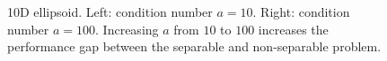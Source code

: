 \begin{figure}[h!]
\begin{minipage}[b]{0.5\linewidth}
 \centering
\end{minipage}
\begin{minipage}[b]{0.5\linewidth}
 \centering
\end{minipage}
\caption{10D ellipsoid. Left: condition number $a\!=\!10$.  Right: condition number $a\!=\!100$. Increasing $a$ from $10$ to $100$  increases the performance gap between the separable and non-separable problem.} 
\label{ellipse_t1}
\end{figure}

